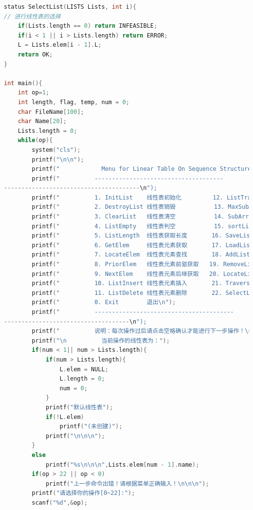 \documentclass[supercite]{Experimental_Report}
\theoremstyle{definition}
\begin{document}
\begin{lstlisting}[language=c]
status SelectList(LISTS Lists, int i){
// 进行线性表的选择
    if(Lists.length == 0) return INFEASIBLE;
    if(i < 1 || i > Lists.length) return ERROR;
    L = Lists.elem[i - 1].L;
    return OK;
}

int main(){
    int op=1;
    int length, flag, temp, num = 0;
    char FileName[100];
    char Name[20];
    Lists.length = 0;
    while(op){
        system("cls");
        printf("\n\n");
        printf("            Menu for Linear Table On Sequence Structure \n");
        printf("          -------------------------------------
---------------------------------------\n");
        printf("    	  1. InitList    线性表初始化         12. ListTraverse   线性表遍历\n");
        printf("    	  2. DestroyList 线性表销毁           13. MaxSubArray    线性表最大连续数组和获取\n");
        printf("    	  3. ClearList   线性表清空           14. SubArrayNum    线性表指定连续数组和数目\n");
        printf("    	  4. ListEmpty   线性表判空           15. sortList       线性表排序\n");
        printf("    	  5. ListLength  线性表获取长度       16. SaveList       线性表文件保存\n");
        printf("    	  6. GetElem     线性表元素获取       17. LoadList       线性表文件录入\n");
        printf("          7. LocateElem  线性表元素查找       18. AddList        多线性表添加\n");
        printf("          8. PriorElem   线性表元素前驱获取   19. RemoveList     多线性表删除\n");
        printf("          9. NextElem    线性表元素后继获取   20. LocateList     多线性表位置查找\n");
        printf("          10. ListInsert 线性表元素插入       21. TraverseList   多线性表遍历\n");
        printf("          11. ListDelete 线性表元素删除       22. SelectList     线性表操作选择\n");
        printf("    	  0. Exit        退出\n");
        printf("          ----------------------------------------
------------------------------------\n");
		printf("          说明：每次操作过后请点击空格确认才能进行下一步操作！\n");
		printf("\n          当前操作的线性表为：");
		if(num < 1|| num > Lists.length){
			if(num > Lists.length){
				L.elem = NULL;
				L.length = 0; 
				num = 0;
			}
			printf("默认线性表");
			if(!L.elem)
				printf("(未创建)");
			printf("\n\n\n");	
		}
		else
			printf("%s\n\n\n",Lists.elem[num - 1].name); 
		if(op > 22 || op < 0)
        	printf("上一步命令出错！请根据菜单正确输入！\n\n\n");
        printf("请选择你的操作[0~22]:");
        scanf("%d",&op);
        

\end{lstlisting}
\end{document}
